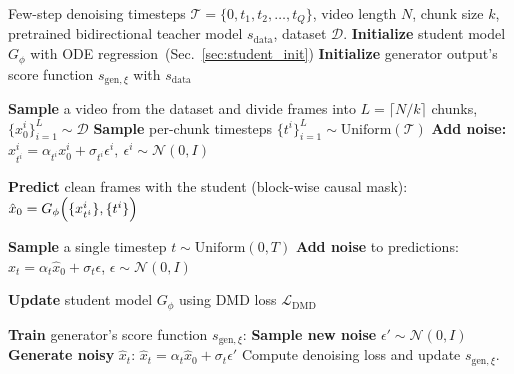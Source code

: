 \begin{algorithm}[t]
\small 
\caption{Asymmetric Distillation with DMD \label{alg:training}}
\begin{algorithmic}[1]
\Require Few-step denoising timesteps $\mathcal{T} = \{0, t_1, t_2, \dots, t_Q \}$, video length $N$, chunk size $k$, pretrained bidirectional teacher model $s_{\text{data}}$, dataset $\mathcal{D}$.
\vspace{0.5em}
\State \textbf{Initialize} student model $G_\phi$ with ODE regression~(Sec.~\ref{sec:student_init})
\State \textbf{Initialize} generator output's score function $s_{\text{gen},\xi}$ with $s_{\text{data}}$

    \State \textbf{Sample} a video from the dataset and divide frames into $L = \lceil N / k \rceil$ chunks, $\{ x_0^{i} \}_{i=1}^L \sim \mathcal{D}$
    \State \textbf{Sample} per-chunk timesteps $\{ t^{i} \}_{i=1}^L\sim \text{Uniform}(\mathcal{T})$
    \State \textbf{Add noise:} ${ x_{t^i}^{i} = \alpha_{t^{i}} x_0^{i} + \sigma_{t^{i}} \epsilon^{i},\ \epsilon^{i} \sim \mathcal{N}(0, I)}$
    
    \State \textbf{Predict} clean frames with the student (block-wise causal mask): 
          $\hat{x}_0 = G_\phi\Bigl(\{ x_{t^i}^i \}, \{ t^i \}\Bigr)$\;

    
    \State \textbf{Sample} a single timestep $t\sim \text{Uniform}(0, T)$
    \State \textbf{Add noise} to predictions: $\hat{x}_t = \alpha_t \hat{x}_0 + \sigma_t \epsilon$, $\epsilon\sim \mathcal{N}(0, I)$
    
    \State \textbf{Update} student model $G_\phi$ using DMD loss $\mathcal{L}_{\text{DMD}}$     
    
    \State \textbf{Train} generator's score function $s_{\text{gen},\xi}$:
    \State \quad \textbf{Sample new noise} $\epsilon'\sim \mathcal{N}(0, I)$
    \State \quad \textbf{Generate noisy} $\hat{x}_t$: $\hat{x}_t = \alpha_t \hat{x}_0 + \sigma_t \epsilon'$
    \State \quad Compute denoising loss and update $s_{\text{gen},\xi}$.     
\EndWhile
\end{algorithmic}
\end{algorithm}


    
    
    
    


